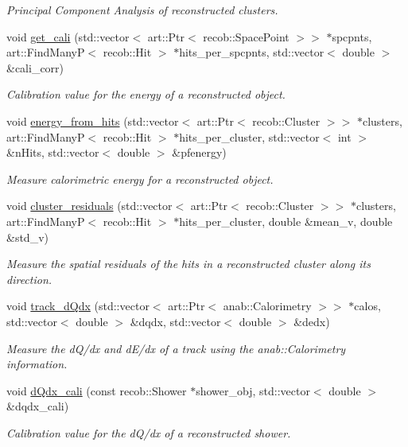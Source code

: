 \begin{DoxyCompactItemize}
\begin{DoxyCompactList}\small\item\em Principal Component Analysis of reconstructed clusters. \end{DoxyCompactList}\item 
void \hyperlink{classlee_1_1EnergyHelper_a188cdbff934accbcf32bb658abea2412}{get\-\_\-cali} (std\-::vector$<$ art\-::\-Ptr$<$ recob\-::\-Space\-Point $>$$>$ $\ast$spcpnts, art\-::\-Find\-Many\-P$<$ recob\-::\-Hit $>$ $\ast$hits\-\_\-per\-\_\-spcpnts, std\-::vector$<$ double $>$ \&cali\-\_\-corr)
\begin{DoxyCompactList}\small\item\em Calibration value for the energy of a reconstructed object. \end{DoxyCompactList}\item 
void \hyperlink{classlee_1_1EnergyHelper_a682a97a35bf38e4ef2e4b38732719dcd}{energy\-\_\-from\-\_\-hits} (std\-::vector$<$ art\-::\-Ptr$<$ recob\-::\-Cluster $>$$>$ $\ast$clusters, art\-::\-Find\-Many\-P$<$ recob\-::\-Hit $>$ $\ast$hits\-\_\-per\-\_\-cluster, std\-::vector$<$ int $>$ \&n\-Hits, std\-::vector$<$ double $>$ \&pfenergy)
\begin{DoxyCompactList}\small\item\em Measure calorimetric energy for a reconstructed object. \end{DoxyCompactList}\item 
void \hyperlink{classlee_1_1EnergyHelper_ae55ba831390287b749641b84b1be7e0d}{cluster\-\_\-residuals} (std\-::vector$<$ art\-::\-Ptr$<$ recob\-::\-Cluster $>$$>$ $\ast$clusters, art\-::\-Find\-Many\-P$<$ recob\-::\-Hit $>$ $\ast$hits\-\_\-per\-\_\-cluster, double \&mean\-\_\-v, double \&std\-\_\-v)
\begin{DoxyCompactList}\small\item\em Measure the spatial residuals of the hits in a reconstructed cluster along its direction. \end{DoxyCompactList}\item 
void \hyperlink{classlee_1_1EnergyHelper_a5698af14612035f672a852041d067f9d}{track\-\_\-d\-Qdx} (std\-::vector$<$ art\-::\-Ptr$<$ anab\-::\-Calorimetry $>$$>$ $\ast$calos, std\-::vector$<$ double $>$ \&dqdx, std\-::vector$<$ double $>$ \&dedx)
\begin{DoxyCompactList}\small\item\em Measure the d\-Q/dx and d\-E/dx of a track using the anab\-::\-Calorimetry information. \end{DoxyCompactList}\item 
void \hyperlink{classlee_1_1EnergyHelper_ad730a5ca3f5d4df30ee4aebb8f877e2f}{d\-Qdx\-\_\-cali} (const recob\-::\-Shower $\ast$shower\-\_\-obj, std\-::vector$<$ double $>$ \&dqdx\-\_\-cali)
\begin{DoxyCompactList}\small\item\em Calibration value for the d\-Q/dx of a reconstructed shower. \end{DoxyCompactList}\end{DoxyCompactItemize}


